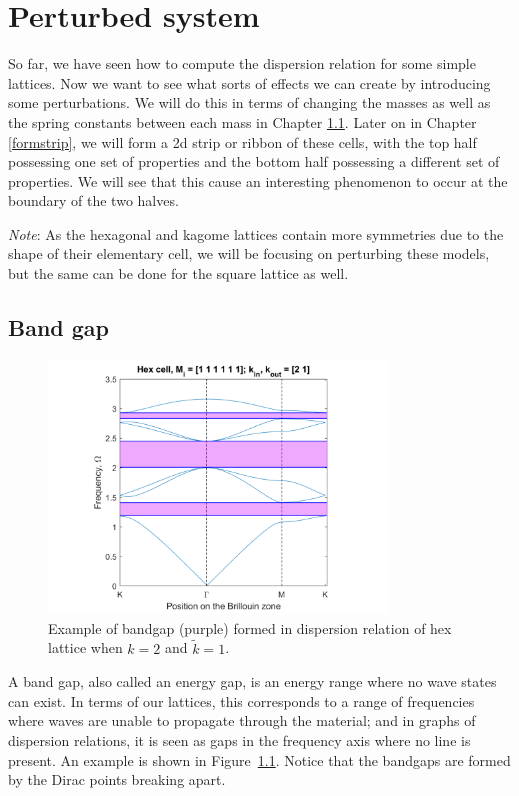 \chapter{Perturbed system}
\label{perturbed}

So far, we have seen how to compute the dispersion relation for some simple
lattices. Now we want to see what sorts of effects we can create by introducing
some perturbations. We will do this in terms of changing the masses as well as
the spring constants between each mass in Chapter \ref{formbandgap}. Later on
in Chapter \ref{formstrip}, we will form a 2d strip or ribbon of these cells,
with the top half possessing one set of properties and the bottom half
possessing a different set of properties. We will see that this cause an
interesting phenomenon to occur at the boundary of the two halves.

\textit{Note}: As the hexagonal and kagome lattices contain more symmetries due
to the shape of their elementary cell, we will be focusing on perturbing these
models, but the same can be done for the square lattice as well. 

\section{Band gap}
\label{formbandgap}

\begin{figure}[!h]
\centering
\includegraphics[width=0.8\textwidth]{imgs/bandgapex.png}
\caption{\label{fig:bandgapex} Example of bandgap (purple) formed in dispersion
  relation of hex lattice when $k=2$ and $\tilde{k}=1$.}
\end{figure}

A band gap, also called an energy gap, is an energy range where no wave states
can exist. In terms of our lattices, this corresponds to a range of frequencies
where waves are unable to propagate through the material; and in graphs of
dispersion relations, it is seen as gaps in the frequency axis where no line
is present. An example is shown in Figure~\ref{fig:bandgapex}. Notice that the
bandgaps are formed by the Dirac points breaking apart.

